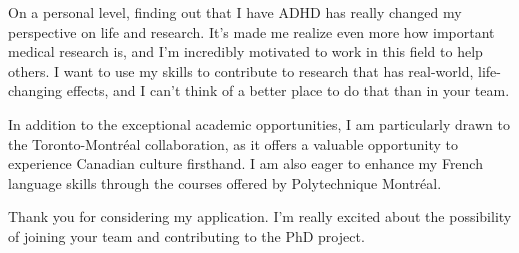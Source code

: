 \documentclass[11pt,letterpaper,sans]{moderncv}
\begin{document}
On a personal level, finding out that I have ADHD has really changed my perspective on life and research. It’s made me realize even more how important medical research is, and I’m incredibly motivated to work in this field to help others. I want to use my skills to contribute to research that has real-world, life-changing effects, and I can’t think of a better place to do that than in your team.

In addition to the exceptional academic opportunities, I am particularly drawn to the Toronto-Montréal collaboration, as it offers a valuable opportunity to experience Canadian culture firsthand. I am also eager to enhance my French language skills through the courses offered by Polytechnique Montréal.

Thank you for considering my application. I’m really excited about the possibility of joining your team and contributing to the PhD project.


\makeletterclosing
\end{document}
